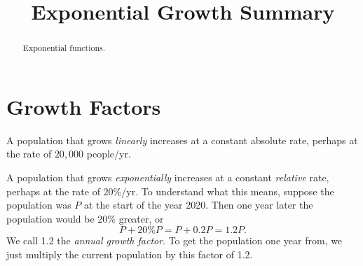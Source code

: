 \documentclass{ximera}
\title{Exponential Growth Summary}
\begin{document}
\begin{abstract}
Exponential functions.
\end{abstract}
\maketitle


\section{Growth Factors}
A population that grows \emph{linearly} increases at a constant absolute rate, perhaps at the rate of $20,000$ people/yr. 

A population that grows \emph{exponentially} increases at a constant \emph{relative} rate, perhaps at the rate of $20\%$/yr. To understand what this means, suppose the population was $P$ at the start of the year 2020. Then one year later the population would be $20\%$ greater, or 
\[
   P + 20\% P  = P + 0.2 P = 1.2P .
\]
We call 1.2 the \emph{annual growth factor}. To get the population one year from, we just multiply the current population by this factor of 1.2.
\end{document}
